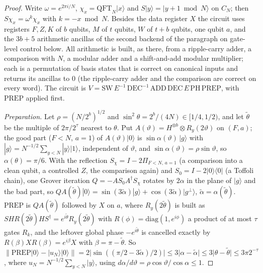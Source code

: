 \begin{proof}
Write $\omega = e^{2\pi i/N}$, $\chi_x = \mathrm{QFT}_N|x\rangle$ and $S|y\rangle = |y+1 \bmod N\rangle$ on $C_N$; then $S\chi_x = \omega^{k}\chi_x$ with $k = -x \bmod N$. Besides the data register $X$ the circuit uses registers $F, Z, K$ of $b$ qubits, $M$ of $t$ qubits, $W$ of $t+b$ qubits, one qubit $a$, and the $3b+5$ arithmetic ancillas of the second backend of the paragraph on gate-level control below. All arithmetic is built, as there, from a ripple-carry adder, a comparison with $N$, a modular adder and a shift-and-add modular multiplier; each is a permutation of basis states that is correct on canonical inputs and returns its ancillas to $0$ (the ripple-carry adder and the comparison are correct on every word). The circuit is $V = \mathrm{SW}\,E^{-1}\,\mathrm{DEC}^{-1}\,\mathrm{ADD}\,\mathrm{DEC}\,E\,\mathrm{PH}\,\mathrm{PREP}$, with $\mathrm{PREP}$ applied first.

\emph{Preparation.} Let $\rho = (N/2^b)^{1/2}$ and $\sin^2\theta = 2^b/(4N) \in [1/4, 1/2)$, and let $\tilde\theta$ be the multiple of $2\pi/2^\tau$ nearest to $\theta$. Put $A(\vartheta) = H^{\otimes b}\otimes R_y(2\vartheta)$ on $(F, a)$; the good part ($F < N$, $a = 1$) of $A(\vartheta)|0\rangle$ is $\sin\alpha(\vartheta)\,|g\rangle$ with $|g\rangle = N^{-1/2}\sum_{y<N}|y\rangle|1\rangle$, independent of $\vartheta$, and $\sin\alpha(\vartheta) = \rho\sin\vartheta$, so $\alpha(\theta) = \pi/6$. With the reflection $S_\chi = I - 2\Pi_{F<N,\,a=1}$ (a comparison into a clean qubit, a controlled $Z$, the comparison again) and $S_0 = I - 2|0\rangle\langle0|$ (a Toffoli chain), one Grover iteration $Q = -A S_0 A^\dagger S_\chi$ rotates by $2\alpha$ in the plane of $|g\rangle$ and the bad part, so $QA(\tilde\theta)|0\rangle = \sin(3\tilde\alpha)|g\rangle + \cos(3\tilde\alpha)|g^\perp\rangle$, $\tilde\alpha = \alpha(\tilde\theta)$. $\mathrm{PREP}$ is $Q A(\tilde\theta)$ followed by $X$ on $a$, where $R_y(2\tilde\theta)$ is built as $S H R(2\tilde\theta) H S^\dagger = e^{i\tilde\theta}R_y(2\tilde\theta)$ with $R(\phi) = \mathrm{diag}(1, e^{i\phi})$ a product of at most $\tau$ gates $R_k$, and the leftover global phase $-e^{i\tilde\theta}$ is cancelled exactly by $R(\beta)XR(\beta) = e^{i\beta}X$ with $\beta = \pi - \tilde\theta$. So $\|\mathrm{PREP}|0\rangle - |u_N\rangle|0\rangle\| = 2|\sin((\pi/2 - 3\tilde\alpha)/2)| \le 3|\alpha - \tilde\alpha| \le 3|\theta - \tilde\theta| \le 3\pi 2^{-\tau}$, where $u_N = N^{-1/2}\sum_{y<N}|y\rangle$, using $d\alpha/d\vartheta = \rho\cos\vartheta/\cos\alpha \le 1$.


\end{proof}
